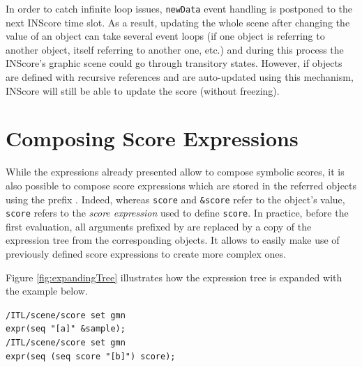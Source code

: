 \documentclass{article}
\newcommand{\OSC}[1]{{\fontsize{9.5pt}{10pt} \selectfont\texttt{#1}}}
\newcommand{\oper}[1]{\textcolor{figRed}{#1}}
\newcommand{\param}[1]{\textcolor{figOrange}{#1}}
\newcommand{\prefix}[1]{\textcolor{figBlue}{#1}}
\newcommand{\lowTilde}{\texttildelow}
\newcommand{\tab}{\hspace*{4mm}}
\newcommand{\sample}	[1]			{\vspace{-0.2em}\begin{center}\colorbox{mygrey}{\begin{minipage}[t]{0.95\columnwidth} {\small \texttt{#1}}\end{minipage}}\end{center}}
\begin{document}
{In order to catch infinite loop issues, \OSC{newData} event handling is postponed to the next INScore time slot. As a result, updating the whole scene after changing the value of an object can take several event loops (if one object is referring to another object, itself referring to another one, etc.) and during this process the INScore's graphic scene could go through transitory states. However, if objects are defined with recursive references and are auto-updated using this mechanism, INScore will still be able to update the score (without freezing).

\section{Composing Score Expressions}
\label{composingExpr}
While the expressions already presented allow to compose symbolic scores, it is also possible to compose score expressions which are stored in the referred objects using the prefix \OSC{\prefix{\lowTilde}}. Indeed, whereas \OSC{\param{score}} and \OSC{\prefix{\&}\param{score}} refer to the object's value, \OSC{\prefix{\lowTilde}\param{score}} refers to the \emph{score expression} used to define \OSC{score}. In practice, before the first evaluation, all arguments prefixed by \OSC{\prefix{\lowTilde}} are replaced by a copy of the expression tree from the corresponding objects.
It allows to easily make use of previously defined score expressions to create more complex ones. 

Figure \ref{fig:expandingTree} illustrates how the expression tree is expanded with the example below.

\sample{/ITL/scene/score set gmn\\
\tab expr(\oper{seq} \param{"[a]"} \prefix{\&}\param{sample});\\
/ITL/scene/score set gmn  \\
\tab expr(\oper{seq} (\oper{seq} \prefix{\lowTilde}\param{score} \param{"[b]"}) \prefix{\lowTilde}\param{score});
}

}
\end{document}
